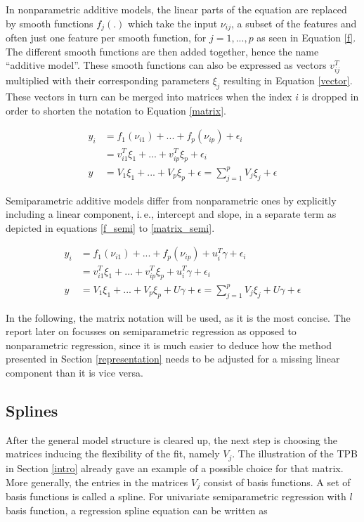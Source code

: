 \documentclass[12pt]{article}
\begin{document}
In nonparametric additive models, the linear parts of the equation are replaced by smooth functions $f_j(.)$ which take the input $\nu_{ij}$, a subset of the features and often just one feature per smooth function, for $j = 1,...,p$ as seen in Equation \ref{f}. 
The different smooth functions are then added together, hence the name ``additive model''.
These smooth functions can also be expressed as vectors $v^T_{ij}$  multiplied with their corresponding parameters $\xi_j$ resulting in Equation \ref{vector}. These vectors in turn can be merged into matrices when the index $i$ is dropped in order to shorten the notation to Equation   \ref{matrix}.

\begin{align}
y_i &= f_1(\nu_{i1}) + ... + f_p(\nu_{ip})+\epsilon_i \label{f}\\
&=  v^T_{i1}\xi_1 + ... + v^T_{ip}\xi_p+\epsilon_i \label{vector} \\
y &= V_1\xi_1 + ... + V_p\xi_p +\epsilon= \sum_{j=1}^p V_j\xi_j +\epsilon \label{matrix}
\end{align}

Semiparametric additive models differ from nonparametric ones by explicitly including a linear component, i.\,e., intercept and slope, in a separate term as depicted in equations \ref{f_semi} to \ref{matrix_semi}.

\begin{align}
y_i &= f_1(\nu_{i1}) + ... + f_p(\nu_{ip})+ u^T_i\gamma+\epsilon_i\label{f_semi}\\
&=  v^T_{i1}\xi_1 + ... + v^T_{ip}\xi_p+ u^T_i\gamma+\epsilon_i\label{vector_semi} \\
y&= V_1\xi_1 + ... + V_p\xi_p + U\gamma +\epsilon= \sum_{j=1}^p V_j\xi_j + U\gamma+\epsilon\label{matrix_semi}
\end{align}

In the following, the matrix notation will be used, as it is the most concise.
The report later on focusses on semiparametric regression as opposed to nonparametric regression, since it is much easier to deduce how the method presented in Section \ref{representation} needs to be adjusted for a missing linear component than it is vice versa.

\subsection{Splines}



After the general model structure is cleared up, the next step is choosing the matrices inducing the flexibility of the fit, namely $V_j$.
The illustration of the TPB in Section \ref{intro} already gave an example of a possible choice for that matrix. More generally, the entries in the matrices $V_j$ consist of basis functions. A set of basis functions is called a spline. For univariate semiparametric regression with $l$ basis function, a regression spline equation can be written as   
\end{document}
